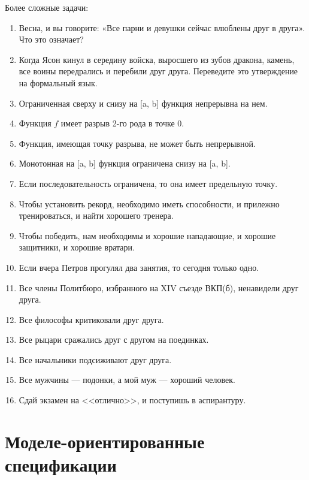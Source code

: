 \documentclass[12pt]{extreport}
\makeatletter
\renewcommand\appendix{\par
  \setcounter{chapter}{0}%
  \setcounter{section}{0}%
  \def\@chapapp{\appendixname}%
  \def\thechapter{\@Asbuk\c@chapter}}
\makeatother
\begin{document}
Более сложные задачи:
\begin{enumerate}
\item Весна, и вы говорите: «Все парни и девушки сейчас влюблены друг в друга». Что это означает?
\item Когда Ясон кинул в середину войска, выросшего из зубов дракона, камень, все воины передрались и перебили друг друга.
Переведите это утверждение на формальный язык.
\item Ограниченная сверху и снизу на [a, b] функция непрерывна на нем.
\item Функция $f$ имеет разрыв 2-го рода в точке 0.
\item Функция, имеющая точку разрыва, не может быть непрерывной.
\item Монотонная на [a, b] функция ограничена снизу на [a, b].
\item Если последовательность ограничена, то она имеет предельную точку.
\item Чтобы установить рекорд, необходимо иметь способности, и прилежно тренироваться, и найти хорошего тренера.
\item Чтобы победить, нам необходимы и хорошие нападающие, и хорошие защитники, и хорошие вратари.
\item Если вчера Петров прогулял два занятия, то сегодня только одно.
\item Все члены Политбюро, избранного на XIV съезде ВКП(б), ненавидели друг друга.
\item Все философы критиковали друг друга.
\item Все рыцари сражались друг с другом на поединках.
\item Все начальники подсиживают друг друга.
\item Все мужчины --- подонки, а мой муж --- хороший человек.
\item Сдай экзамен на <<отлично>>, и поступишь в аспирантуру.
\end{enumerate}

\chapter{Моделе-ориентированные спецификации}


\appendix

\end{document}
